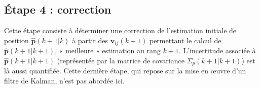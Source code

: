 
\subsection*{Étape 4 : correction}

Cette étape consiste à déterminer une correction de l’estimation initiale de position $\hat{\bm{p}}(k + 1|k)$  à partir
des $\bm{v}_{ij}(k + 1)$ permettant le calcul de $\hat{\bm{p}}(k + 1|k+1)$, « meilleure » estimation au rang $k+1$. L’incertitude
associée à $\hat{\bm{p}}(k + 1|k+1)$ (représentée par la matrice de covariance $\Sigma_p(k+1|k+1)$) est là aussi quantifiée.
Cette dernière étape, qui repose sur la mise en œuvre d’un filtre de Kalman, n’est pas abordée ici.

